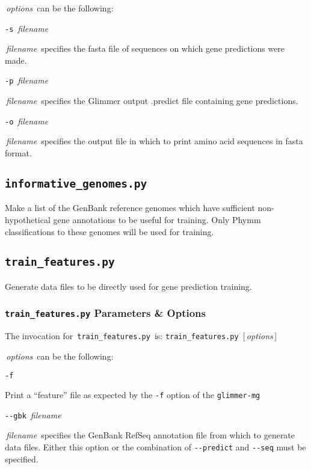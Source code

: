 \documentclass[fleqn,titlepage,11pt]{article}
\def\Desc#1{\,\mbox{\emph{#1}}\,}
\def\Pg#1{\texttt{#1}}
\begin{document}
\Desc{options} can be the following:
\bl{}\RaggedRight

\exdent
  \verb`-s` \Desc{filename}

  \Desc{filename} specifies the fasta file of sequences on which
  gene predictions were made.

\exdent
  \verb`-p` \Desc{filename}

  \Desc{filename} specifies the Glimmer output .predict file
  containing gene predictions.

\exdent
  \verb`-o` \Desc{filename}

  \Desc{filename} specifies the output file in which to print
  amino acid sequences in fasta format.

\el

\subsection{\Pg{informative\_genomes.py}}

Make a list of the GenBank reference genomes which have sufficient
non-hypothetical gene annotations to be useful for training. Only
Phymm classifications to these genomes will be used for training.

\subsection{\Pg{train\_features.py}}

Generate data files to be directly used for gene prediction training.

\subsubsection{\Pg{train\_features.py} Parameters \& Options}

The invocation for \,\Pg{train\_features.py}\, is:
\bq
  \Pg{train\_features.py}\, [\Desc{options}]
\eq

\Desc{options} can be the following:
\bl{}\RaggedRight

\exdent
  \verb`-f`

  Print a ``feature'' file as expected by the \verb`-f` option of the
  \Pg{glimmer-mg}

\exdent
  \verb`--gbk` \Desc{filename}

  \Desc{filename} specifies the GenBank RefSeq annotation file from
  which to generate data files. Either this option or the combination
  of \verb`--predict` and \verb`--seq` must be specified.
\end{document}
